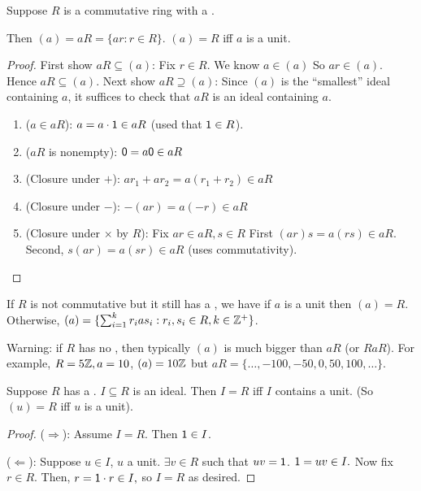 \documentclass[notes.tex]{subfiles}
\begin{document}
\begin{proposition}
	Suppose $R$ is a commutative ring with a \one. 

	Then $(a) = aR = \{ar : r\in R\}$. $(a) = R$ iff $a$ is a unit. 
\end{proposition}
\begin{proof}
	\tabin
		First show $aR \subseteq (a)$:
	\tabout
	Fix $r\in R$. We know $a\in (a)$ So $ar\in (a)$. Hence $aR \subseteq (a)$.
	\tabin
		Next show $aR\supseteq (a)$:
	\tabout
	Since $(a)$ is the ``smallest'' ideal containing $a$, it suffices to check that $aR$ is an ideal containing $a$.
	\begin{enumerate}
		\item ($a\in aR$): $a=a\cdot \mathsf{1} \in aR$ (used that $\mathsf{1} \in R$).
		\item ($aR$ is nonempty): $\mathsf{0} = a\mathsf{0} \in aR$
		\item (Closure under $+$): $ar_1 + ar_2 = a(r_1 + r_2) \in aR$
		\item (Closure under $-$): $-(ar) = a(-r) \in aR$
		\item (Closure under $\times$ by $R$): Fix $ar\in aR, s\in R$
		First $(ar)s = a(rs) \in aR$. Second, $s(ar) = a(sr) \in aR$ (uses commutativity).
	\end{enumerate}
\end{proof}
\begin{remark}
	If $R$ is not commutative but it still has a \one, we have if $a$ is a unit then $(a) = R$. Otherwise, $(a) = \{\sum_{i=1}^kr_ias_i : r_i, s_i\in R, k\in \mathbb{Z}^+\}$.
\end{remark}
\begin{remark}
	Warning: if $R$ has no \one, then typically $(a)$ is much bigger than $aR$ (or $RaR$).
	For example, $R = 5\mathbb{Z}, a=10$, $(a) = 10\mathbb{Z}$ but $aR = \{\ldots, -100, -50, 0, 50, 100, \ldots\}$.
\end{remark}

\begin{proposition}
	\label{prop:unitideal}
	Suppose $R$ has a \one. $I\subseteq R$ is an ideal. Then $I=R$ iff $I$ contains a unit.
	(So $(u) = R$ iff $u$ is a unit).
\end{proposition}
\begin{proof}
($\Longrightarrow$): Assume $I=R$. Then $\mathsf{1} \in I$.

($\Longleftarrow$): Suppose $u\in I$, $u$ a unit. $\exists v\in R$ such that $uv =\mathsf{1}$. $\mathsf{1} = uv \in I.$ Now fix $r\in R$. Then, $r = \mathsf{1}\cdot r\in I,$ so $I=R$ as desired.
\end{proof}
\end{document}
